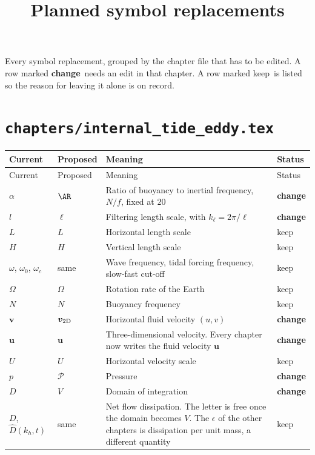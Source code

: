 \documentclass[11pt,a4paper]{article}
\title{Planned symbol replacements}
\author{}
\date{}
\renewcommand{\vec}[1]{\boldsymbol{#1}}
\newcommand{\chg}{\textbf{change}}
\newcommand{\kp}{keep}
\begin{document}
\maketitle

Every symbol replacement, grouped by the chapter file that has to be edited.
A row marked \chg\ needs an edit in that chapter. A row marked \kp\ is listed
so the reason for leaving it alone is on record.

\begingroup
\renewcommand{\arraystretch}{1.3}

\section*{\texttt{chapters/internal\_tide\_eddy.tex}}

\begin{longtable}{@{}p{3.1cm} p{3.1cm} p{8.6cm} p{1.6cm}@{}}
\toprule
Current & Proposed & Meaning & Status \\
\midrule
\endfirsthead
\toprule
Current & Proposed & Meaning & Status \\
\midrule
\endhead
$\alpha$ & $\AR$ & Ratio of buoyancy to inertial frequency, $N/f$, fixed at $20$ & \chg \\
$l$ & $\ell$ & Filtering length scale, with $k_\ell = 2\pi/\ell$ & \chg \\
$L$ & $L$ & Horizontal length scale & \kp \\
$H$ & $H$ & Vertical length scale & \kp \\
$\omega$, $\omega_0$, $\omega_c$ & same & Wave frequency, tidal forcing frequency, slow-fast cut-off & \kp \\
$\Omega$ & $\Omega$ & Rotation rate of the Earth & \kp \\
$N$ & $N$ & Buoyancy frequency & \kp \\
$\vec{v}$ & $\vec{v}_{\rm 2D}$ & Horizontal fluid velocity $(u,v)$ & \chg \\
$\bm{u}$ & $\vec{u}$ & Three-dimensional velocity. Every chapter now writes the fluid velocity $\vec{u}$ & \chg \\
$U$ & $U$ & Horizontal velocity scale & \kp \\
$p$ & $\mathcal{P}$ & Pressure & \chg \\
$D$ & $V$ & Domain of integration & \chg \\
$D$, $\hat{D}(k_h,t)$ & same & Net flow dissipation. The letter is free once the domain becomes $V$. The $\epsilon$ of the other chapters is dissipation per unit mass, a different quantity & \kp \\

\end{longtable}
\end{document}

